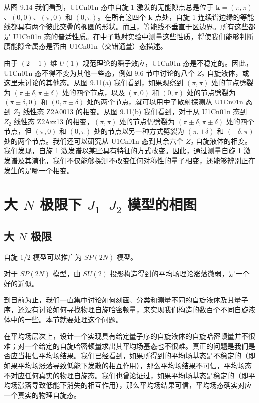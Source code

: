 从图 9.14 我们看到，U1Cn01n 态中自旋 1 激发的无能隙点总是位于 $\pmb{k}=(\pi,\pi)$、$(0,0)$、$(\pi,0)$ 和 $(0,\pi)$。在所有这四个 $\pmb{k}$ 点处，自旋 1 连续谱边缘的等能线都具有两个彼此交叠的椭圆的形状。而且，等能线不垂直于区边界。所有这些都是 U1Cn01n 态的普适性质。在中子散射实验中测量这些性质，将使我们能够判断赝能隙金属态是否由 U1Cn01n（交错通量）态描述。

由于 $(2+1)$ 维 $U(1)$ 规范理论的瞬子效应，U1Cn01n 态是不稳定的。因此，U1Cn01n 态不得不变为其他一些态，例如 9.6 节中讨论的八个 $Z_2$ 自旋液体，或这里未讨论的其他态。从图 9.11(a) 我们看到，如果观察到 $(\pi,\pi)$ 处的节点劈裂为 $(\pi\pm\delta,\pi\pm\delta)$ 处的四个节点，以及 $(\pi,0)$ 和 $(0,\pi)$ 处的节点劈裂为 $(\pi\pm\delta,0)$ 和 $(0,\pi\pm\delta)$ 处的两个节点，就可以用中子散射探测从 U1Cn01n 态到 $Z_2$ 线性态 Z2A0013 的相变。从图 9.11(b) 我们看到，对于从 U1Cn01n 态到 $Z_2$ 线性态 Z2Azz13 的相变，$(\pi,\pi)$ 处的节点仍劈裂为 $(\pi\pm\delta,\pi\pm\delta)$ 处的四个节点，但 $(\pi,0)$ 和 $(0,\pi)$ 处的节点以另一种方式劈裂为 $(\pi,\pm\delta)$ 和 $(\pm\delta,\pi)$ 处的两个节点。我们还可以研究从 U1Cn01n 态到其余六个 $Z_2$ 自旋液体的相变。我们发现，自旋 1 激发谱以某些具有特征的方式改变。因此，通过测量自旋 1 激发谱及其演化，我们不仅能够探测不改变任何对称性的量子相变，还能够辨别正在发生的是哪一个相变。

\section{大 $N$ 极限下 $J_1$--$J_2$ 模型的相图}

\subsection{大 $N$ 极限}

\begin{keypoints}
\item 自旋-1/2 模型可以推广为 $SP(2N)$ 模型。
\item 对于 $SP(2N)$ 模型，由 $SU(2)$ 投影构造得到的平均场理论涨落微弱，是一个好的近似。
\end{keypoints}

到目前为止，我们一直集中讨论如何刻画、分类和测量不同的自旋液体及其量子序，还没有讨论如何寻找物理自旋哈密顿量，来实现我们构造的数百个不同自旋液体中的一些。本节就要处理这个问题。

在平均场层次上，设计一个实现具有给定量子序的自旋液体的自旋哈密顿量并不很难；对一个给定的自旋哈密顿量求出其平均场基态也不很难。真正的问题是我们是否应当相信平均场结果。我们已经看到，如果所得到的平均场基态是不稳定的（即如果平均场涨落导致低能下发散的相互作用），那么平均场结果不可信，平均场态不对应任何真实的物理自旋态。我们也曾论证过，如果平均场基态是稳定的（即平均场涨落导致低能下消失的相互作用），那么平均场结果可信，平均场态确实对应一个真实的物理自旋态。

